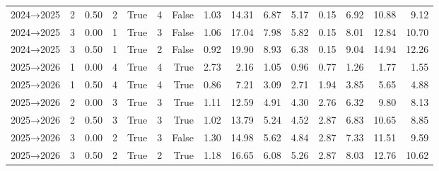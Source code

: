 \begin{table}[htbp]
\begin{tabular}{lrrrrrrrrrrrrrr}
2024→2025 & 2 & 0.50 & 2 & True & 4 & False & 1.03 & 14.31 & 6.87 & 5.17 & 0.15 & 6.92 & 10.88 & 9.12 \\
2024→2025 & 3 & 0.00 & 1 & True & 3 & False & 1.06 & 17.04 & 7.98 & 5.82 & 0.15 & 8.01 & 12.84 & 10.70 \\
2024→2025 & 3 & 0.50 & 1 & True & 2 & False & 0.92 & 19.90 & 8.93 & 6.38 & 0.15 & 9.04 & 14.94 & 12.26 \\
2025→2026 & 1 & 0.00 & 4 & True & 4 & True & 2.73 & 2.16 & 1.05 & 0.96 & 0.77 & 1.26 & 1.77 & 1.55 \\
2025→2026 & 1 & 0.50 & 4 & True & 4 & True & 0.86 & 7.21 & 3.09 & 2.71 & 1.94 & 3.85 & 5.65 & 4.88 \\
2025→2026 & 2 & 0.00 & 3 & True & 3 & True & 1.11 & 12.59 & 4.91 & 4.30 & 2.76 & 6.32 & 9.80 & 8.13 \\
2025→2026 & 2 & 0.50 & 3 & True & 3 & True & 1.02 & 13.79 & 5.24 & 4.52 & 2.87 & 6.83 & 10.65 & 8.85 \\
2025→2026 & 3 & 0.00 & 2 & True & 3 & False & 1.30 & 14.98 & 5.62 & 4.84 & 2.87 & 7.33 & 11.51 & 9.59 \\
2025→2026 & 3 & 0.50 & 2 & True & 2 & True & 1.18 & 16.65 & 6.08 & 5.26 & 2.87 & 8.03 & 12.76 & 10.62 \\
\bottomrule
\end{tabular}
\end{table}

